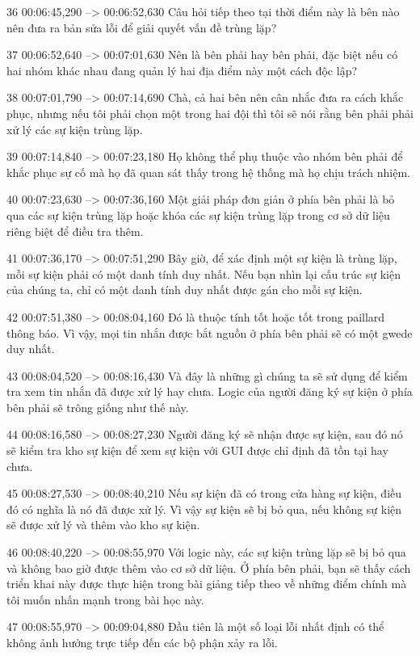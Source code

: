 36
00:06:45,290 --> 00:06:52,630
Câu hỏi tiếp theo tại thời điểm này là bên nào nên đưa ra bản sửa lỗi để giải quyết vấn đề trùng lặp?

37
00:06:52,640 --> 00:07:01,630
Nên là bên phải hay bên phải, đặc biệt nếu có hai nhóm khác nhau đang quản lý hai địa điểm này một cách độc lập?

38
00:07:01,790 --> 00:07:14,690
Chà, cả hai bên nên cân nhắc đưa ra cách khắc phục, nhưng nếu tôi phải chọn một trong hai đội thì tôi sẽ nói rằng bên phải phải xử lý các sự kiện trùng lặp.

39
00:07:14,840 --> 00:07:23,180
Họ không thể phụ thuộc vào nhóm bên phải để khắc phục sự cố mà họ đã quan sát thấy trong hệ thống mà họ chịu trách nhiệm.

40
00:07:23,630 --> 00:07:36,160
Một giải pháp đơn giản ở phía bên phải là bỏ qua các sự kiện trùng lặp hoặc khóa các sự kiện trùng lặp trong cơ sở dữ liệu riêng biệt để điều tra thêm.

41
00:07:36,170 --> 00:07:51,290
Bây giờ, để xác định một sự kiện là trùng lặp, mỗi sự kiện phải có một danh tính duy nhất.  Nếu bạn nhìn lại cấu trúc sự kiện của chúng ta, chỉ có một danh tính duy nhất được gán cho mỗi sự kiện.

42
00:07:51,380 --> 00:08:04,160
Đó là thuộc tính tốt hoặc tốt trong paillard thông báo.  Vì vậy, mọi tin nhắn được bắt nguồn ở phía bên phải sẽ có một gwede duy nhất.

43
00:08:04,520 --> 00:08:16,430
Và đây là những gì chúng ta sẽ sử dụng để kiểm tra xem tin nhắn đã được xử lý hay chưa.  Logic của người đăng ký sự kiện ở phía bên phải sẽ trông giống như thế này.

44
00:08:16,580 --> 00:08:27,230
Người đăng ký sẽ nhận được sự kiện, sau đó nó sẽ kiểm tra kho sự kiện để xem sự kiện với GUI được chỉ định đã tồn tại hay chưa.

45
00:08:27,530 --> 00:08:40,210
Nếu sự kiện đã có trong cửa hàng sự kiện, điều đó có nghĩa là nó đã được xử lý.  Vì vậy sự kiện sẽ bị bỏ qua, nếu không sự kiện sẽ được xử lý và thêm vào kho sự kiện.

46
00:08:40,220 --> 00:08:55,970
Với logic này, các sự kiện trùng lặp sẽ bị bỏ qua và không bao giờ được thêm vào cơ sở dữ liệu.  Ở phía bên phải, bạn sẽ thấy cách triển khai này được thực hiện trong bài giảng tiếp theo về những điểm chính mà tôi muốn nhấn mạnh trong bài học này.

47
00:08:55,970 --> 00:09:04,880
Đầu tiên là một số loại lỗi nhất định có thể không ảnh hưởng trực tiếp đến các bộ phận xảy ra lỗi.

